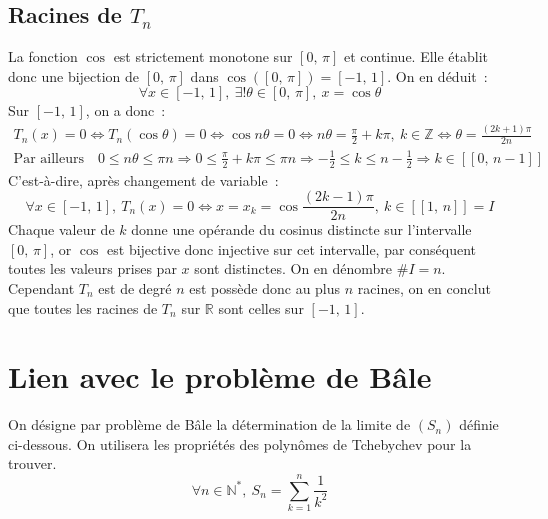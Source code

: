 \documentclass{article}
\begin{document}
  \subsection{Racines de $T_n$}\label{racines_de_tn}
  La fonction $\cos$ est strictement monotone sur $[0,\, \pi]$ et continue. Elle établit donc une bijection de $[0,\, \pi]$ dans $\cos([0,\, \pi]) = [-1,\, 1]$. On en déduit~:
  \[
  \forall x\in[-1,\, 1],\ \exists! \theta\in[0,\, \pi],\ x = \cos \theta
  \]
  Sur $[-1,\, 1]$, on a donc~:
  \begin{align*}
    T_n(x) = 0 \iff T_n(\cos \theta) = 0 \iff \cos n\theta = 0
    \iff n\theta = \frac{\pi}{2} + k\pi,\ k\in\mathbb{Z} \iff \theta = \frac{(2k + 1)\pi}{2n} \\
    \text{Par ailleurs}\quad 0 \leqslant n\theta \leqslant \pi n
    \Longrightarrow 0 \leqslant \frac{\pi}{2} + k\pi \leqslant \pi n \Longrightarrow -\frac{1}{2} \leqslant k \leqslant n - \frac{1}{2} \Longrightarrow k \in[\![0,\, n-1]\!]
  \end{align*}
  C'est-à-dire, après changement de variable~:
  \[
  \forall x\in[-1,\, 1],\ T_n(x) = 0 \iff x = x_k = \cos \frac{(2k - 1)\pi}{2n},\ k\in[\![1,\, n]\!] = I
  \]
  Chaque valeur de $k$ donne une opérande du cosinus distincte sur l'intervalle $[0,\, \pi]$, or $\cos$ est bijective donc injective sur cet intervalle, par conséquent toutes les valeurs prises par $x$ sont distinctes. On en dénombre $\#I = n$. Cependant $T_n$ est de degré $n$ est possède donc au plus $n$ racines, on en conclut que toutes les racines de $T_n$ sur $\mathbb{R}$ sont celles sur $[-1,\, 1]$.

  \section{Lien avec le problème de Bâle}
  On désigne par problème de Bâle la détermination de la limite de $(S_n)$ définie ci-dessous. On utilisera les propriétés des polynômes de Tchebychev pour la trouver.
  \[
  \forall n\in\mathbb{N}^*,\ S_n = \sum_{k=1}^n \frac{1}{k^2}
  \]
\end{document}

